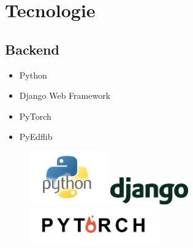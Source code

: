 \documentclass[xcolor=x11names,compress, 
					handout %
]{beamer}
\theoremstyle{definition} \newtheorem{esempio}{Esempio}
\theoremstyle{definition}
\begin{document}
\section{Tecnologie}
	\subsection{Backend}
		\begin{frame}{\subsecname}
			\begin{itemize}
				\item Python
				\item Django Web Framework 
				\item PyTorch 
				\item PyEdflib
			\end{itemize}
			\begin{figure}
				\includegraphics[width=0.3\textwidth]{immagini/python}
				\includegraphics[width=0.3\textwidth]{immagini/django}
				\includegraphics[width=0.5\textwidth]{immagini/pytorch}
			\end{figure}
		\end{frame}
	
\end{document}
